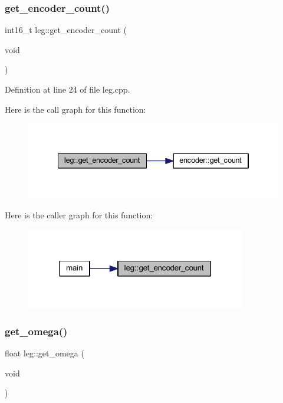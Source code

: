 \subsubsection{\texorpdfstring{get\_encoder\_count()}{get\_encoder\_count()}}
{\footnotesize\ttfamily int16\+\_\+t leg\+::get\+\_\+encoder\+\_\+count (\begin{DoxyParamCaption}\item[{void}]{ }\end{DoxyParamCaption})}



Definition at line 24 of file leg.\+cpp.

Here is the call graph for this function\+:
\nopagebreak
\begin{figure}[H]
\begin{center}
\leavevmode
\includegraphics[width=334pt]{classleg_ab7d470db701c7745266338157b79e1d0_cgraph}
\end{center}
\end{figure}
Here is the caller graph for this function\+:
\nopagebreak
\begin{figure}[H]
\begin{center}
\leavevmode
\includegraphics[width=272pt]{classleg_ab7d470db701c7745266338157b79e1d0_icgraph}
\end{center}
\end{figure}
\mbox{\label{classleg_a90a92add134cc7f610202ae703ed8857}} 
\subsubsection{\texorpdfstring{get\_omega()}{get\_omega()}}
{\footnotesize\ttfamily float leg\+::get\+\_\+omega (\begin{DoxyParamCaption}\item[{void}]{ }\end{DoxyParamCaption})}



